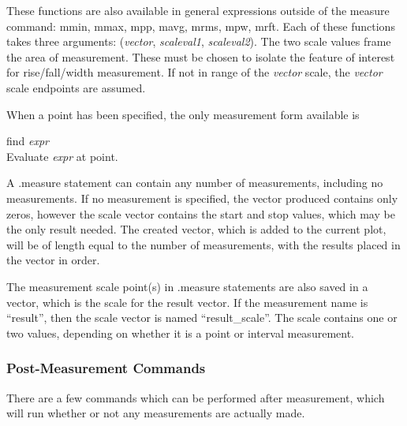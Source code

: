 These functions are also available in general expressions outside of
the {\cb measure} command:  {\cb mmin}, {\cb mmax}, {\cb mpp}, {\cb
mavg}, {\cb mrms}, {\cb mpw}, {\cb mrft}.  Each of these functions
takes three arguments:  ({\it vector\/}, {\it scaleval1\/}, {\it
scaleval2\/}).  The two scale values frame the area of measurement. 
These must be chosen to isolate the feature of interest for
rise/fall/width measurement.  If not in range of the {\it vector}
scale, the {\it vector} scale endpoints are assumed.

When a point has been specified, the only measurement form
available is

\begin{description}
\item{{\vt find} {\it expr}}\\
Evaluate {\it expr} at point.
\end{description}

A {\vt .measure} statement can contain any number of measurements,
including no measurements.  If no measurement is specified, the vector
produced contains only zeros, however the scale vector contains the
start and stop values, which may be the only result needed.  The
created vector, which is added to the current plot, will be of length
equal to the number of measurements, with the results placed in the
vector in order.

The measurement scale point(s) in {\vt .measure} statements are also
saved in a vector, which is the scale for the result vector.  If the
measurement name is ``{\vt result}'', then the scale vector is named
``{\vt result\_scale}''.  The scale contains one or two values,
depending on whether it is a point or interval measurement.

\subsubsection{Post-Measurement Commands}

There are a few commands which can be performed after measurement,
which will run whether or not any measurements are actually made.

